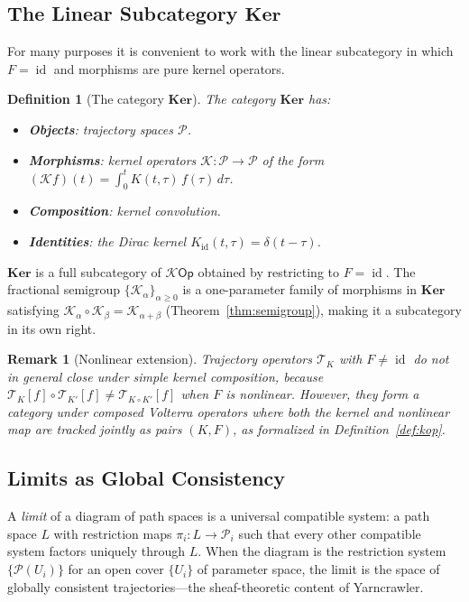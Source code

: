 \documentclass[12pt]{article}
\newtheorem{definition}[theorem]{Definition}
\newtheorem{remark}[theorem]{Remark}
\DeclareMathOperator{\id}{id}
\newcommand{\Pcal}{\mathcal{P}}
\newcommand{\Kcal}{\mathcal{K}}
\newcommand{\TK}{\mathcal{T}_K}
\begin{document}
\subsection{The Linear Subcategory \texorpdfstring{$\mathbf{Ker}$}{Ker}}

For many purposes it is convenient to work with the linear subcategory in
which $F = \id$ and morphisms are pure kernel operators.

\begin{definition}[The category $\mathbf{Ker}$]
\label{def:ker}
The category $\mathbf{Ker}$ has:
\begin{itemize}
  \item \textbf{Objects}: trajectory spaces $\Pcal$.
  \item \textbf{Morphisms}: kernel operators $\mathcal{K} \colon \Pcal \to
    \Pcal$ of the form $(\mathcal{K}f)(t) = \int_0^t K(t,\tau)\,f(\tau)\,d\tau$.
  \item \textbf{Composition}: kernel convolution.
  \item \textbf{Identities}: the Dirac kernel $K_{\id}(t,\tau) = \delta(t-\tau)$.
\end{itemize}
\end{definition}

$\mathbf{Ker}$ is a full subcategory of $\Kcal\mathsf{Op}$ obtained by
restricting to $F = \id$. The fractional semigroup
$\{\mathcal{K}_\alpha\}_{\alpha \geq 0}$ is a one-parameter family of
morphisms in $\mathbf{Ker}$ satisfying
$\mathcal{K}_\alpha \circ \mathcal{K}_\beta = \mathcal{K}_{\alpha+\beta}$
(Theorem~\ref{thm:semigroup}), making it a subcategory in its own right.

\begin{remark}[Nonlinear extension]
Trajectory operators $\TK$ with $F \neq \id$ do not in general close under
simple kernel composition, because
$\TK[f] \circ \mathcal{T}_{K'}[f] \neq \mathcal{T}_{K\circ K'}[f]$
when $F$ is nonlinear. However, they form a category under composed
Volterra operators where both the kernel and nonlinear map are tracked
jointly as pairs $(K, F)$, as formalized in Definition~\ref{def:kop}.
\end{remark}

\subsection{Limits as Global Consistency}

A \emph{limit} of a diagram of path spaces is a universal compatible
system: a path space $L$ with restriction maps $\pi_i \colon L \to
\Pcal_i$ such that every other compatible system factors uniquely through
$L$. When the diagram is the restriction system $\{\Pcal(U_i)\}$ for an
open cover $\{U_i\}$ of parameter space, the limit is the space of globally
consistent trajectories---the sheaf-theoretic content of Yarncrawler.
\end{document}
